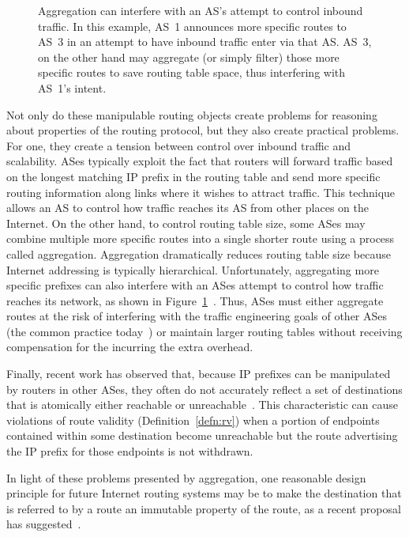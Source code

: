 \begin{figure}
\centering{}
\caption[How aggregation can interfere with an AS's attempt to control
  inbound traffic.]{Aggregation can interfere with an AS's attempt to
  control inbound traffic.  In this example, AS~1 announces more
  specific routes to AS~3 in an attempt to have inbound traffic enter
  via that AS.  AS~3, on the other hand may aggregate (or simply filter)
  those more specific routes to save routing table space, thus
  interfering with AS~1's intent.}
\label{fig:aggregate}
\end{figure}

Not only do these manipulable routing objects create problems for reasoning
about properties of the routing protocol, but they also create practical
problems.  For one, they create a tension between control over inbound
traffic and scalability.  ASes typically exploit the fact that routers
will forward traffic based on the longest matching IP prefix in the routing
table and send more specific routing information along links where it
wishes to attract traffic.  This technique allows an AS to control how
traffic reaches its AS from 
other places on the Internet.  On the other hand, to control routing
table size, some ASes may combine multiple more specific routes into a
single shorter route using a process called aggregation.  Aggregation
dramatically reduces routing table size because Internet addressing is
typically hierarchical.  Unfortunately, aggregating more specific
prefixes can also interfere with an ASes attempt to control how traffic
reaches its network, as shown in
Figure~\ref{fig:aggregate}~\cite{id-path-validation}.  Thus, ASes must
either aggregate routes at the risk of interfering with the traffic
engineering goals of other ASes (the common practice
today~\cite{nanog-prefix-aggregation}) or maintain larger routing tables
without receiving compensation for the incurring the extra overhead.

Finally, recent work has observed that, because IP prefixes can be
manipulated by routers in other ASes, they often do not accurately
reflect a set of destinations 
that is atomically either reachable or
unreachable~\cite{Freedman2005}. This characteristic can cause
violations of route validity (Definition~\ref{defn:rv}) when a portion
of endpoints contained within some destination become unreachable but
the route advertising the IP prefix for those endpoints is not
withdrawn.

In light of these problems presented by aggregation, one reasonable
design principle for future Internet routing systems may be to make the
destination that is referred to by a route an 
immutable property of the route, as a recent proposal has
suggested~\cite{Vutukuru2005b}. 

